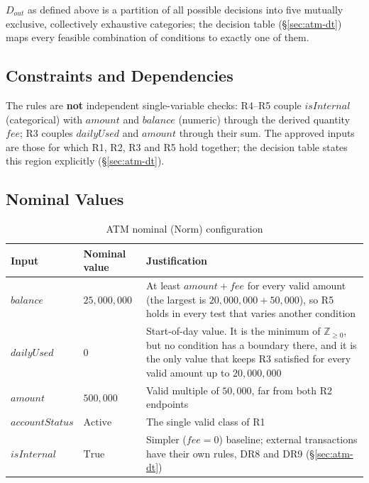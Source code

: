 \documentclass[11pt,a4paper]{article}
\newcommand{\Norm}{\mathrm{Norm}}
\begin{document}
\(D_{out}\) as defined above is a partition of all possible decisions into five
mutually exclusive, collectively exhaustive categories; the decision table
(\S\ref{sec:atm-dt}) maps every feasible combination of conditions to
exactly one of them.

\subsection{Constraints and Dependencies}
\label{sec:atm-constraints}

The rules are \textbf{not} independent single-variable checks:
R4--R5 couple \(\mathit{isInternal}\) (categorical) with \(\mathit{amount}\) and
\(\mathit{balance}\) (numeric) through the derived quantity \(\mathit{fee}\);
R3 couples \(\mathit{dailyUsed}\) and \(\mathit{amount}\) through their sum.
The approved inputs are those for which R1, R2, R3 and R5 hold together; the
decision table states this region explicitly (\S\ref{sec:atm-dt}).

\subsection{Nominal Values}
\label{sec:atm-nominal}

\begin{table}[H]
\centering
\caption{ATM nominal (\(\Norm\)) configuration}
\label{tab:atm-nominal}
\begin{tabularx}{\textwidth}{l l Y}
\toprule
Input & Nominal value & Justification \\
\midrule
\(\mathit{balance}\) & $25{,}000{,}000$ & At least \(\mathit{amount}+\mathit{fee}\) for every valid amount (the largest is $20{,}000{,}000+50{,}000$), so R5 holds in every test that varies another condition \\
\(\mathit{dailyUsed}\) & $0$ & Start-of-day value. It is the minimum of \(\mathbb{Z}_{\ge0}\), but no condition has a boundary there, and it is the only value that keeps R3 satisfied for every valid amount up to $20{,}000{,}000$ \\
\(\mathit{amount}\) & $500{,}000$ & Valid multiple of $50{,}000$, far from both R2 endpoints \\
\(\mathit{accountStatus}\) & \(\mathrm{Active}\) & The single valid class of R1 \\
\(\mathit{isInternal}\) & \(\mathrm{True}\) & Simpler (\(\mathit{fee}=0\)) baseline; external transactions have their own rules, DR8 and DR9 (\S\ref{sec:atm-dt}) \\
\bottomrule
\end{tabularx}
\end{table}
\end{document}
